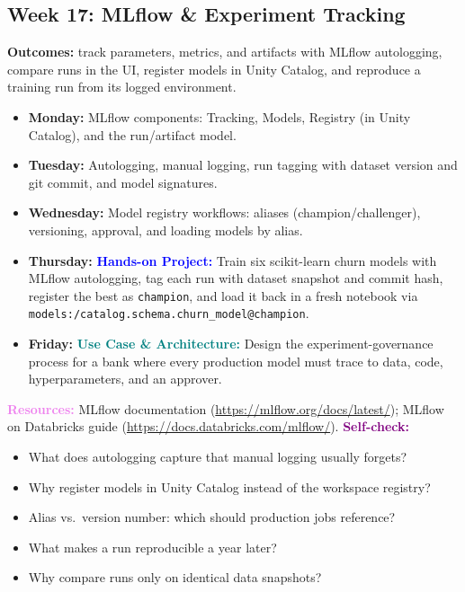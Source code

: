 \documentclass[11pt, a4paper]{article}
\newcommand{\project}[1]{\vspace{1mm}\noindent\textbf{\textcolor{blue}{Hands-on Project:}} #1}
\newcommand{\usecase}[1]{\vspace{1mm}\noindent\textbf{\textcolor{teal}{Use Case \& Architecture:}} #1}
\newcommand{\dayitem}[2]{\item \textbf{#1:} #2}
\newcommand{\resources}[1]{\vspace{1mm}\noindent\textbf{\textcolor{violet}{Resources:}} #1}
\newcommand{\selfcheck}[1]{\vspace{1mm}\noindent\textbf{\textcolor{purple}{Self-check:}} #1}
\begin{document}
\subsection*{Week 17: MLflow \& Experiment Tracking}
\par\noindent\textbf{Outcomes:} track parameters, metrics, and artifacts with MLflow autologging, compare runs in the UI, register models in Unity Catalog, and reproduce a training run from its logged environment.
\begin{itemize}[label=-]
    \dayitem{Monday}{MLflow components: Tracking, Models, Registry (in Unity Catalog), and the run/artifact model.}
    \dayitem{Tuesday}{Autologging, manual logging, run tagging with dataset version and git commit, and model signatures.}
    \dayitem{Wednesday}{Model registry workflows: aliases (champion/challenger), versioning, approval, and loading models by alias.}
    \dayitem{Thursday}{\project{Train six scikit-learn churn models with MLflow autologging, tag each run with dataset snapshot and commit hash, register the best as \texttt{champion}, and load it back in a fresh notebook via \texttt{models:/catalog.schema.churn\_model@champion}.}}
    \dayitem{Friday}{\usecase{Design the experiment-governance process for a bank where every production model must trace to data, code, hyperparameters, and an approver.}}
\end{itemize}
\resources{MLflow documentation (\url{https://mlflow.org/docs/latest/}); MLflow on Databricks guide (\url{https://docs.databricks.com/mlflow/}).}
\selfcheck{\begin{itemize}[label=-, leftmargin=1.5em, itemsep=0pt]
    \item What does autologging capture that manual logging usually forgets?
    \item Why register models in Unity Catalog instead of the workspace registry?
    \item Alias vs.\ version number: which should production jobs reference?
    \item What makes a run reproducible a year later?
    \item Why compare runs only on identical data snapshots?
\end{itemize}}
\end{document}
